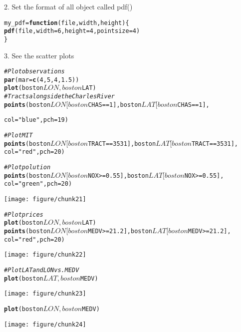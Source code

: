 \documentclass[11pt, a4paper]{article}\usepackage[]{graphicx}\usepackage[]{color}
\makeatletter
\def\maxwidth{ %
  \ifdim\Gin@nat@width>\linewidth
    \linewidth
  \else
    \Gin@nat@width
  \fi
}
\newcommand{\hlstr}[1]{\textcolor[rgb]{0.192,0.494,0.8}{#1}}%
\newcommand{\hlcom}[1]{\textcolor[rgb]{0.678,0.584,0.686}{\textit{#1}}}%
\newcommand{\hlkwd}[1]{\textcolor[rgb]{0.737,0.353,0.396}{\textbf{#1}}}%
\newenvironment{kframe}{%
 \def\at@end@of@kframe{}%
 \ifinner\ifhmode%
  \def\at@end@of@kframe{\end{minipage}}%
  \begin{minipage}{\columnwidth}%
 \fi\fi%
 \def\FrameCommand##1{\hskip\@totalleftmargin \hskip-\fboxsep
 \colorbox{shadecolor}{##1}\hskip-\fboxsep
     \hskip-\linewidth \hskip-\@totalleftmargin \hskip\columnwidth}%
 \MakeFramed {\advance\hsize-\width
   \@totalleftmargin\z@ \linewidth\hsize
   \@setminipage}}%
 {\par\unskip\endMakeFramed%
 \at@end@of@kframe}
\newenvironment{knitrout}{}{} %
\makeatother
\begin{document}
 
2. Set the format of all object called pdf()
\begin{knitrout}
\color{fgcolor}\begin{kframe}
\begin{alltt}
my_pdf = \hlkwd{function}(file, width, height) \{
    \hlkwd{pdf}(file, width = 6, height = 4, pointsize = 4)
\}
\end{alltt}
\end{kframe}
\end{knitrout}

 
3. See the scatter plots
\begin{knitrout}
\color{fgcolor}\begin{kframe}
\begin{alltt}
\hlcom{# Plot observations}
\hlkwd{par}(mar=\hlkwd{c}(4,5,4,1.5))
\hlkwd{plot}(boston$LON, boston$LAT)
\hlcom{# Tracts alongside the Charles River}
\hlkwd{points}(boston$LON[boston$CHAS==1], boston$LAT[boston$CHAS==1],
       
       col=\hlstr{"blue"}, pch=19)

\hlcom{# Plot MIT}
\hlkwd{points}(boston$LON[boston$TRACT==3531],boston$LAT[boston$TRACT==3531],
       col=\hlstr{"red"}, pch=20)

\hlcom{# Plot polution}
\hlkwd{points}(boston$LON[boston$NOX>=0.55], boston$LAT[boston$NOX>=0.55], 
       col=\hlstr{"green"}, pch=20)
\end{alltt}
\end{kframe}
\texttt{[image: figure/chunk21]} 
\begin{kframe}\begin{alltt}

\hlcom{# Plot prices}
\hlkwd{plot}(boston$LON, boston$LAT)
\hlkwd{points}(boston$LON[boston$MEDV>=21.2], boston$LAT[boston$MEDV>=21.2], 
       col=\hlstr{"red"}, pch=20)
\end{alltt}
\end{kframe}
\texttt{[image: figure/chunk22]} 
\begin{kframe}\begin{alltt}

\hlcom{# Plot LAT and LON vs. MEDV}
\hlkwd{plot}(boston$LAT, boston$MEDV)
\end{alltt}
\end{kframe}
\texttt{[image: figure/chunk23]} 
\begin{kframe}\begin{alltt}
\hlkwd{plot}(boston$LON, boston$MEDV)
\end{alltt}
\end{kframe}
\texttt{[image: figure/chunk24]} 

\end{knitrout}
\end{document}
